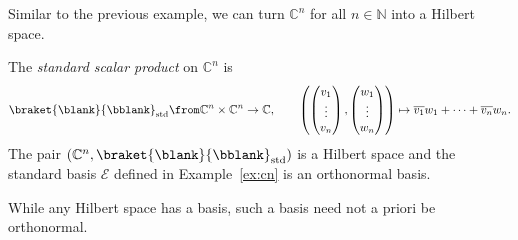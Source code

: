 \documentclass[a4paper,oneside, 12pt]{amsart}
\begin{document}
Similar to the previous example, we can turn \( \mathbb{C}^{n}\) for all \(n\in \mathbb{N}\) into a Hilbert space.

\begin{example}\label{ex:cn-as-Hilbert-space}
  The \emph{standard scalar product} on \( \mathbb{C}^{n}\) is
  \begin{equation*}
    \braket{ \blank }{ \bblank }_{\mathrm{std}}\from \mathbb{C}^{n}\times \mathbb{C}^{n}\to \mathbb{C}, \qquad
    \left(
      \begin{pmatrix}
        v_{1} \\ \vdots \\ v_{n}
      \end{pmatrix},
      \begin{pmatrix}
        w_{1} \\ \vdots \\ w_{n}
      \end{pmatrix}
    \right)
    \mapsto \overline{v_{1}}w_{1} + \dots + \overline{v_{n}}w_{n}.
  \end{equation*}
  The pair \(( \mathbb{C}^{n}, \braket{ \blank }{ \bblank }_{\mathrm{std}})\) is a Hilbert space and the standard basis \(\mathcal{E}\) defined in Example~\ref{ex:cn} is an orthonormal basis.
\end{example}

While any Hilbert space has a basis, such a basis need not a priori be orthonormal.
\end{document}
